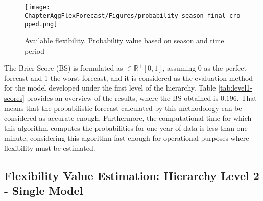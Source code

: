 \begin{figure}[]
\centerline{\texttt{[image: ChapterAggFlexForecast/Figures/probability\_season\_final\_cropped.png]}}
\caption{Available flexibility. Probability value based on season and time period}
\label{fig:LEVEL1-P_YEAR}
\end{figure}

The Brier Score (BS) is formulated as $\in \mathbb{R}^+ [0,1]$, assuming 0 as the perfect forecast and 1 the worst forecast, and it is considered as the evaluation method for the model developed under the first level of the hierarchy. Table \ref{tab:level1-scores} provides an overview of the results, where the BS obtained is $0.196$. That means that the probabilistic forecast calculated by this methodology can be considered as accurate enough. Furthermore, the computational time for which this algorithm computes the probabilities for one year of data is less than one minute, considering this algorithm fast enough for operational purposes where flexibility must be estimated. 

\begin{table}[]
\centering
\caption{Results of model evaluation procedure for the climatology model in the first level of the hierarchy, using the Brier Score (BS) as a performance score.}
\label{tab:level1-scores}
\end{table}

\subsection{Flexibility Value Estimation: Hierarchy Level 2 - Single Model}\label{Sect:ResultsLevel2SingleModel} 

